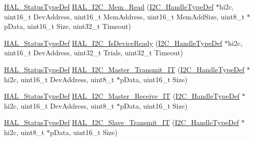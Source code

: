 \begin{DoxyCompactItemize}
\item 
\hyperlink{stm32f4xx__hal__def_8h_a63c0679d1cb8b8c684fbb0632743478f}{H\+A\+L\+\_\+\+Status\+Type\+Def} \hyperlink{group___i2_c___exported___functions___group2_ga7b593a1b85bd989dd002ee209eae4ad2}{H\+A\+L\+\_\+\+I2\+C\+\_\+\+Mem\+\_\+\+Read} (\hyperlink{group___i2_c__handle___structure__definition_ga68e9f45c2fd2161fb827ccdeabb55ea5}{I2\+C\+\_\+\+Handle\+Type\+Def} $\ast$hi2c, uint16\+\_\+t Dev\+Address, uint16\+\_\+t Mem\+Address, uint16\+\_\+t Mem\+Add\+Size, uint8\+\_\+t $\ast$p\+Data, uint16\+\_\+t Size, uint32\+\_\+t Timeout)
\item 
\hyperlink{stm32f4xx__hal__def_8h_a63c0679d1cb8b8c684fbb0632743478f}{H\+A\+L\+\_\+\+Status\+Type\+Def} \hyperlink{group___i2_c___exported___functions___group2_gade6a669a25f0e99ef7fd52724acb3dec}{H\+A\+L\+\_\+\+I2\+C\+\_\+\+Is\+Device\+Ready} (\hyperlink{group___i2_c__handle___structure__definition_ga68e9f45c2fd2161fb827ccdeabb55ea5}{I2\+C\+\_\+\+Handle\+Type\+Def} $\ast$hi2c, uint16\+\_\+t Dev\+Address, uint32\+\_\+t Trials, uint32\+\_\+t Timeout)
\item 
\hyperlink{stm32f4xx__hal__def_8h_a63c0679d1cb8b8c684fbb0632743478f}{H\+A\+L\+\_\+\+Status\+Type\+Def} \hyperlink{group___i2_c___exported___functions___group2_ga48b84e0cff0e44d10e10bf9cc5a6726d}{H\+A\+L\+\_\+\+I2\+C\+\_\+\+Master\+\_\+\+Transmit\+\_\+\+IT} (\hyperlink{group___i2_c__handle___structure__definition_ga68e9f45c2fd2161fb827ccdeabb55ea5}{I2\+C\+\_\+\+Handle\+Type\+Def} $\ast$hi2c, uint16\+\_\+t Dev\+Address, uint8\+\_\+t $\ast$p\+Data, uint16\+\_\+t Size)
\item 
\hyperlink{stm32f4xx__hal__def_8h_a63c0679d1cb8b8c684fbb0632743478f}{H\+A\+L\+\_\+\+Status\+Type\+Def} \hyperlink{group___i2_c___exported___functions___group2_ga2aebdb302ffc0a4dff28dc2c8b59e1e9}{H\+A\+L\+\_\+\+I2\+C\+\_\+\+Master\+\_\+\+Receive\+\_\+\+IT} (\hyperlink{group___i2_c__handle___structure__definition_ga68e9f45c2fd2161fb827ccdeabb55ea5}{I2\+C\+\_\+\+Handle\+Type\+Def} $\ast$hi2c, uint16\+\_\+t Dev\+Address, uint8\+\_\+t $\ast$p\+Data, uint16\+\_\+t Size)
\item 
\hyperlink{stm32f4xx__hal__def_8h_a63c0679d1cb8b8c684fbb0632743478f}{H\+A\+L\+\_\+\+Status\+Type\+Def} \hyperlink{group___i2_c___exported___functions___group2_gabb5814408402b2e9d07c0b414e64fc9d}{H\+A\+L\+\_\+\+I2\+C\+\_\+\+Slave\+\_\+\+Transmit\+\_\+\+IT} (\hyperlink{group___i2_c__handle___structure__definition_ga68e9f45c2fd2161fb827ccdeabb55ea5}{I2\+C\+\_\+\+Handle\+Type\+Def} $\ast$hi2c, uint8\+\_\+t $\ast$p\+Data, uint16\+\_\+t Size)

\end{DoxyCompactItemize}
